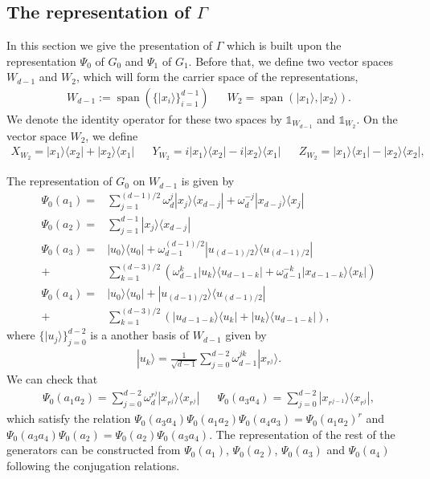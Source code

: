 \documentclass[11pt,letterpaper]{article}
\newcommand{\ket}[1]{|#1\rangle}
\newcommand{\ketbra}[2]{|#1\rangle\langle#2|}
\DeclareMathOperator{\spn}{span}
\newcommand{\1}{\mathbb{1}}
\theoremstyle{definition}
\begin{document}
\subsection{The representation of $\Gamma$}
In this section we give the presentation of $\Gamma$ which is built upon the representation 
$\Psi_0$ of $G_0$ and $\Psi_1$ of $G_1$. 
Before that, we define two vector spaces $W_{d-1}$ and $W_2$, which will form the carrier space 
of the representations,
\begin{align}
	W_{d-1} := \spn(\{\ket{x_i}\}_{i=1}^{d-1}) && W_2 = \spn(\ket{x_1}, \ket{x_2}).
\end{align}
We denote the identity operator for these two spaces by $\1_{W_{d-1}}$ and $\1_{W_2}$.
On the vector space $W_2$, we define
\begin{align}
	X_{W_2} = \ketbra{x_1}{x_2} + \ketbra{x_2}{x_1} &&
	Y_{W_2} = i\ketbra{x_1}{x_2} - i \ketbra{x_2}{x_1} &&
	Z_{W_2} = \ketbra{x_1}{x_1} - \ketbra{x_2}{x_2},
\end{align}

The representation of $G_0$ on $W_{d-1}$ is given by
\begin{align}
	\Psi_0(a_1) =&\sum_{j=1}^{(d-1)/2} \omega_d^j \ketbra{x_j}{x_{d-j}} + \omega_d^{-j} \ketbra{x_{d-j}}{x_{j}} \\
	\Psi_0(a_2) = &\sum_{j=1}^{d-1} \ketbra{x_j}{x_{d-j}}\\
	\Psi_0(a_3) = &\ketbra{u_0}{u_0} +\omega_{d-1}^{(d-1)/2}\ketbra{u_{(d-1)/2}}{u_{(d-1)/2}}\\ + 
	&\sum_{k=1}^{(d-3)/2}\left( \omega_{d-1}^k\ketbra{u_k}{u_{d-1-k}} + \omega_{d-1}^{-k}\ketbra{x_{d-1-k}}{x_k}\right)\\ 
	\Psi_0(a_4) = &\ketbra{u_0}{u_0} +\ketbra{u_{(d-1)/2}}{u_{(d-1)/2}} \\+
	 &\sum_{k=1}^{(d-3)/2}\left(\ketbra{u_{d-1-k}}{u_k} + \ketbra{u_k}{u_{d-1-k}}\right),
\end{align}
where $\{ \ket{u_j} \}_{j=0}^{d-2}$ is a another basis of $W_{d-1}$ given by
\begin{align}
	\ket{u_k} = \frac{1}{\sqrt{d-1}} \sum_{j=0}^{d-2} \omega_{d-1}^{jk} \ket{x_{r^j}}.
\end{align}
We can check that
\begin{align}
	\Psi_0(a_1a_2) =  \sum_{j=0}^{d-2} \omega_d^{r^j} \ketbra{x_{r^j}}{x_{r^j}} &&
	\Psi_0(a_3a_4) =  \sum_{j=0}^{d-2} \ketbra{x_{r^{j-1}}}{x_{r^j}},
\end{align}
which satisfy the relation $\Psi_0(a_3a_4) \Psi_0(a_1a_2) \Psi_0(a_4a_3) = \Psi_0(a_1a_2)^r$ and
$\Psi_0(a_3a_4) \Psi_0(a_2) = \Psi_0(a_2) \Psi_0(a_3a_4)$. The representation of the rest of the generators
can be constructed from $\Psi_0(a_1)$, $\Psi_0(a_2)$, $\Psi_0(a_3)$ and $\Psi_0(a_4)$ following the 
conjugation relations.
\end{document}
